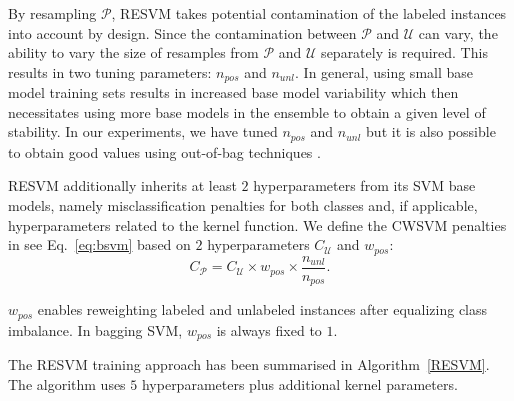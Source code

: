 \documentclass[preprint,elsarticle-num,12pt]{elsarticle}
\makeatletter
\newcommand\footnoteref[1]{\protected@xdef\@thefnmark{\ref{#1}}\@footnotemark}
\makeatother
\begin{document}
By resampling $\mathcal{P}$, RESVM takes potential contamination of the labeled instances into account by design. Since the contamination between $\mathcal{P}$ and $\mathcal{U}$ can vary, the ability to vary the size of resamples from $\mathcal{P}$ and $\mathcal{U}$ separately is required. This results in two tuning parameters: $n_{pos}$ and $n_{unl}$. In general, using small base model training sets results in increased base model variability which then necessitates using more base models in the ensemble to obtain a given level of stability. In our experiments, we have tuned $n_{pos}$ and $n_{unl}$ but it is also possible to obtain good values using out-of-bag techniques \citep{martinez2010out}.\footnoteref{labelednote}

RESVM additionally inherits at least $2$ hyperparameters from its SVM base models, namely misclassification penalties for both classes and, if applicable, hyperparameters related to the kernel function. We define the CWSVM penalties in see Eq.~\eqref{eq:bsvm} based on $2$ hyperparameters $C_{\mathcal{U}}$ and $w_{pos}$:
\begin{equation}
C_{\mathcal{P}} = C_{\mathcal{U}} \times w_{pos} \times \frac{n_{unl}}{n_{pos}}. \label{eq:resvmpenalties}
\end{equation}

$w_{pos}$ enables reweighting labeled and unlabeled instances after equalizing class imbalance. In bagging SVM, $w_{pos}$ is always fixed to $1$. 

\newpage
The RESVM training approach has been summarised in Algorithm~\ref{RESVM}. The algorithm uses $5$ hyperparameters plus additional kernel parameters.

\newlength\mydatalen
\newcommand\mydata[1]{%
  \settowidth\mydatalen{\KwData{}}%
  \setlength\hangindent{\mydatalen}%
  \hspace*{\mydatalen}#1\\}

\newlength\myinputlen
\newcommand\myinput[1]{%
  \settowidth\myinputlen{\KwIn{}}%
  \setlength\hangindent{\myinputlen}%
  \hspace*{\myinputlen}#1\\}
\end{document}
